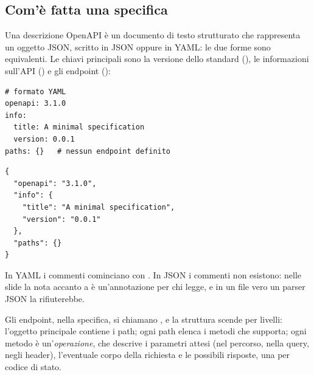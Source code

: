 \subsection{Com'è fatta una specifica}

Una descrizione OpenAPI è un documento di testo strutturato che rappresenta un
oggetto JSON, scritto in JSON oppure in YAML: le due forme sono equivalenti. Le
chiavi principali sono la versione dello standard (), le
informazioni sull'API () e gli endpoint ():

\begin{affianco}[0.46]
\begin{lstlisting}[style=plain, name=openapi.yaml]
# formato YAML
openapi: 3.1.0
info:
  title: A minimal specification
  version: 0.0.1
paths: {}   # nessun endpoint definito
\end{lstlisting}
\risultato
\begin{lstlisting}[style=json, name=openapi.json]
{
  "openapi": "3.1.0",
  "info": {
    "title": "A minimal specification",
    "version": "0.0.1"
  },
  "paths": {}
}
\end{lstlisting}
\end{affianco}

In YAML i commenti cominciano con \code{\#}. In JSON i commenti non esistono:
nelle slide la nota  accanto a  è
un'annotazione per chi legge, e in un file vero un parser JSON la rifiuterebbe.

Gli endpoint, nella specifica, si chiamano , e la struttura scende
per livelli: l'oggetto principale contiene i path; ogni path elenca i metodi
che supporta; ogni metodo è un'\textit{operazione}, che descrive i parametri
attesi (nel percorso, nella query, negli header), l'eventuale corpo della
richiesta e le possibili risposte, una per codice di stato.

